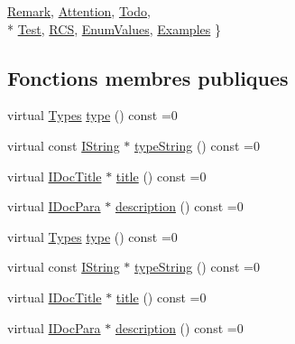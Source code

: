 \begin{DoxyCompactItemize}
\hyperlink{class_i_doc_simple_sect_a937e664f1a8721d79fa0d41f79845a3ca17dacf0c00742c6f9048df4b14232b67}{Remark}, 
\hyperlink{class_i_doc_simple_sect_a937e664f1a8721d79fa0d41f79845a3ca43d61448901702d314d806cde7df486f}{Attention}, 
\hyperlink{class_i_doc_simple_sect_a937e664f1a8721d79fa0d41f79845a3ca0bded7c1620226885f8f850144f19040}{Todo}, 
\\*
\hyperlink{class_i_doc_simple_sect_a937e664f1a8721d79fa0d41f79845a3ca8564879bfd1e7e6f8697e2ae399291e9}{Test}, 
\hyperlink{class_i_doc_simple_sect_a937e664f1a8721d79fa0d41f79845a3caaff387e1371c82ce350ea9aac0a07371}{R\+C\+S}, 
\hyperlink{class_i_doc_simple_sect_a937e664f1a8721d79fa0d41f79845a3ca679478369afe770389a58f68d97a4227}{Enum\+Values}, 
\hyperlink{class_i_doc_simple_sect_a937e664f1a8721d79fa0d41f79845a3ca74cc10c3aa7f13361ec38bd56544806b}{Examples}
 \}
\end{DoxyCompactItemize}
\subsection*{Fonctions membres publiques}
\begin{DoxyCompactItemize}
\item 
virtual \hyperlink{class_i_doc_simple_sect_a937e664f1a8721d79fa0d41f79845a3c}{Types} \hyperlink{class_i_doc_simple_sect_a8909e7be46482d38d0f591e19d18dd75}{type} () const  =0
\item 
virtual const \hyperlink{class_i_string}{I\+String} $\ast$ \hyperlink{class_i_doc_simple_sect_abebe8fcadf4920268766c409c48b96bb}{type\+String} () const  =0
\item 
virtual \hyperlink{class_i_doc_title}{I\+Doc\+Title} $\ast$ \hyperlink{class_i_doc_simple_sect_aff35cdae5ac6b638c69b6163a080696c}{title} () const  =0
\item 
virtual \hyperlink{class_i_doc_para}{I\+Doc\+Para} $\ast$ \hyperlink{class_i_doc_simple_sect_a1ec0e595a9ddb2bcb10128e1e9665568}{description} () const  =0
\item 
virtual \hyperlink{class_i_doc_simple_sect_a937e664f1a8721d79fa0d41f79845a3c}{Types} \hyperlink{class_i_doc_simple_sect_a8909e7be46482d38d0f591e19d18dd75}{type} () const  =0
\item 
virtual const \hyperlink{class_i_string}{I\+String} $\ast$ \hyperlink{class_i_doc_simple_sect_abebe8fcadf4920268766c409c48b96bb}{type\+String} () const  =0
\item 
virtual \hyperlink{class_i_doc_title}{I\+Doc\+Title} $\ast$ \hyperlink{class_i_doc_simple_sect_aff35cdae5ac6b638c69b6163a080696c}{title} () const  =0
\item 
virtual \hyperlink{class_i_doc_para}{I\+Doc\+Para} $\ast$ \hyperlink{class_i_doc_simple_sect_a1ec0e595a9ddb2bcb10128e1e9665568}{description} () const  =0
\end{DoxyCompactItemize}


